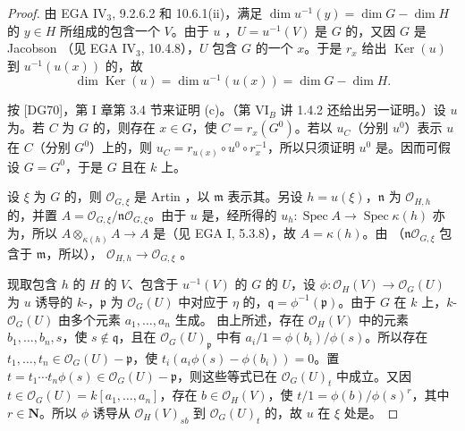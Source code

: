 \begin{proof}
由 EGA IV$_3$, 9.2.6.2 和 10.6.1(ii)，满足 $\dim u^{-1}(y)=\dim G-\dim H$ 的 $y\in H$ 所组成的包含一个 $V$。由于 $u$ ，$U=u^{-1}(V)$ 是 $G$ 的，又因 $G$ 是 Jacobson （见 EGA IV$_3$, 10.4.8），$U$ 包含 $G$ 的一个 $x$。于是 $r_x$ 给出 $\operatorname{Ker}(u)$ 到 $u^{-1}(u(x))$ 的，故
\[
\dim\operatorname{Ker}(u)=\dim u^{-1}(u(x))=\dim G-\dim H.
\]

按 [DG70]，第 I 章第 3.4 节来证明 (c)。（第 VI$_B$ 讲 1.4.2 还给出另一证明。）设 $u$ 为。若 $C$ 为 $G$ 的，则存在 $x\in G$，使 $C=r_x(G^0)$。若以 $u_C$（分别 $u^0$）表示 $u$ 在 $C$（分别 $G^0$）上的，则 $u_C=r_{u(x)}\circ u^0\circ r_x^{-1}$，所以只须证明 $u^0$ 是。因而可假设 $G=G^0$，于是 $G$ 且在 $k$ 上。

设 $\xi$ 为 $G$ 的，则 $\mathcal O_{G,\xi}$ 是 Artin ，以 $\mathfrak m$ 表示其。另设 $h=u(\xi)$，$\mathfrak n$ 为 $\mathcal O_{H,h}$ 的，并置 $A=\mathcal O_{G,\xi}/\mathfrak n\mathcal O_{G,\xi}$。由于 $u$ 是，经所得的 $u_h:\operatorname{Spec}A\to\operatorname{Spec}\kappa(h)$ 亦为，所以 $A\otimes_{\kappa(h)}A\to A$ 是（见 EGA I, 5.3.8），故 $A=\kappa(h)$。由 （$\mathfrak n\mathcal O_{G,\xi}$ 包含于 $\mathfrak m$，所以）， $\mathcal O_{H,h}\to\mathcal O_{G,\xi}$ 。

现取包含 $h$ 的 $H$ 的 $V$、包含于 $u^{-1}(V)$ 的 $G$ 的 $U$，设 $\phi:\mathcal O_H(V)\to\mathcal O_G(U)$ 为 $u$ 诱导的 $k$-，$\mathfrak p$ 为 $\mathcal O_G(U)$ 中对应于 $\eta$ 的，$\mathfrak q=\phi^{-1}(\mathfrak p)$。由于 $G$ 在 $k$ 上，$k$- $\mathcal O_G(U)$ 由多个元素 $a_1,\ldots,a_n$ 生成。
由上所述，存在 $\mathcal O_H(V)$ 中的元素 $b_1,\ldots,b_n,s$，使 $s\notin\mathfrak q$，且在 $\mathcal O_G(U)_{\mathfrak p}$ 中有 $a_i/1=\phi(b_i)/\phi(s)$。所以存在 $t_1,\ldots,t_n\in\mathcal O_G(U)-\mathfrak p$，使 $t_i(a_i\phi(s)-\phi(b_i))=0$。置 $t=t_1\cdots t_n\phi(s)\in\mathcal O_G(U)-\mathfrak p$，则这些等式已在 $\mathcal O_G(U)_t$ 中成立。又因 $t\in\mathcal O_G(U)=k[a_1,\ldots,a_n]$，存在 $b\in\mathcal O_H(V)$，使 $t/1=\phi(b)/\phi(s)^r$，其中 $r\in\mathbf N$。所以 $\phi$ 诱导从 $\mathcal O_H(V)_{sb}$ 到 $\mathcal O_G(U)_t$ 的，故 $u$ 在 $\xi$ 处是。


\end{proof}
